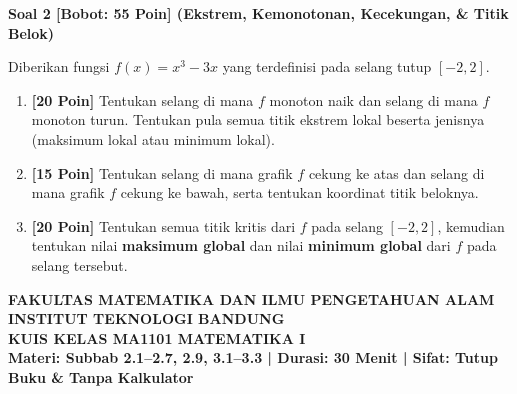 \documentclass[11pt,a4paper]{article}
\begin{document}
\vspace{14pt}

\noindent\textbf{Soal 2 [Bobot: 55 Poin] (Ekstrem, Kemonotonan, Kecekungan, \& Titik Belok)}
\vspace{4pt}

\noindent Diberikan fungsi $f(x) = x^3 - 3x$ yang terdefinisi pada selang tutup $[-2, 2]$.
\begin{enumerate}[label=(\alph*), leftmargin=24pt]
    \item \textbf{[20 Poin]} Tentukan selang di mana $f$ monoton naik dan selang di mana $f$ monoton turun. Tentukan pula semua titik ekstrem lokal beserta jenisnya (maksimum lokal atau minimum lokal).
    \item \textbf{[15 Poin]} Tentukan selang di mana grafik $f$ cekung ke atas dan selang di mana grafik $f$ cekung ke bawah, serta tentukan koordinat titik beloknya.
    \item \textbf{[20 Poin]} Tentukan semua titik kritis dari $f$ pada selang $[-2, 2]$, kemudian tentukan nilai \textbf{maksimum global} dan nilai \textbf{minimum global} dari $f$ pada selang tersebut.
\end{enumerate}

\newpage

\begin{center}
    {\large \textbf{FAKULTAS MATEMATIKA DAN ILMU PENGETAHUAN ALAM}}\\
    {\large \textbf{INSTITUT TEKNOLOGI BANDUNG}}\\[4pt]
    {\large \textbf{KUIS KELAS MA1101 MATEMATIKA I}}\\[2pt]
    \textbf{Materi: Subbab 2.1--2.7, 2.9, 3.1--3.3 \quad | \quad Durasi: 30 Menit \quad | \quad Sifat: Tutup Buku \& Tanpa Kalkulator}
\end{center}

\vspace{2pt}
\noindent{}
\end{document}
